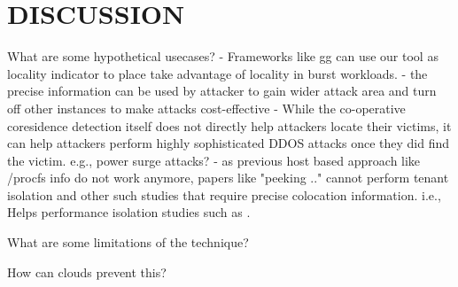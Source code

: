 \section{DISCUSSION}
\label{sec:discussion}
\todo{}
What are some hypothetical usecases?
- Frameworks like gg can use our tool as locality indicator to place 
take advantage of locality in burst workloads. 
- the precise information can be used by attacker to gain wider 
attack area and turn off other instances to make attacks cost-effective
- While the co-operative coresidence detection itself 
does not directly help attackers locate their victims, it can 
help attackers perform highly sophisticated DDOS attacks once 
they did find the victim. e.g., power surge attacks?
- as previous host based approach like /procfs info do not work anymore,
papers like "peeking .." cannot perform tenant isolation and other such 
studies that require precise colocation information. i.e., Helps performance isolation 
studies such as \cite{wangusenix2018}.

What are some limitations of the technique?


How can clouds prevent this?
